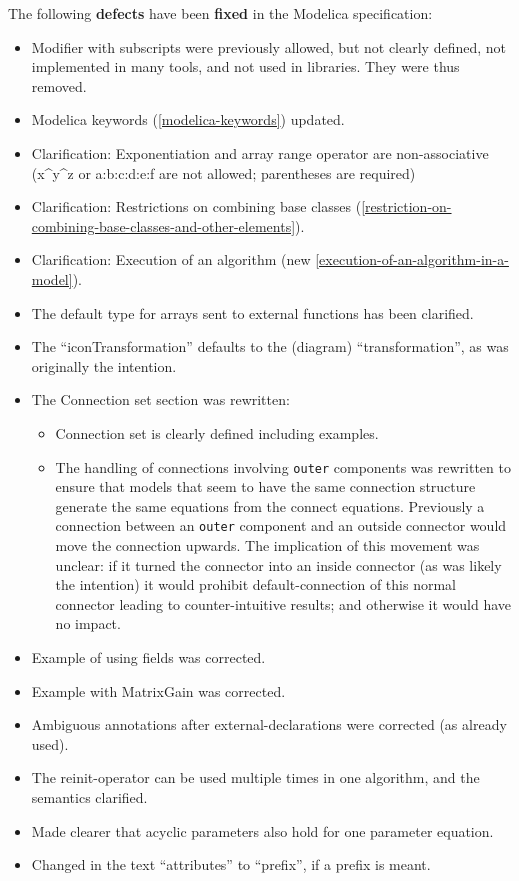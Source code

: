 
The following \textbf{defects} have been \textbf{fixed} in the Modelica
specification:

\begin{itemize}
\item
  Modifier with subscripts were previously allowed, but not clearly
  defined, not implemented in many tools, and not used in libraries.
  They were thus removed.
\item
  Modelica keywords (\autoref{modelica-keywords}) updated.
\item
  Clarification: Exponentiation and array range operator are
  non-associative\\
  (x\^{}y\^{}z or a:b:c:d:e:f are not allowed; parentheses are required)
\item
  Clarification: Restrictions on combining base classes (\autoref{restriction-on-combining-base-classes-and-other-elements}).
\item
  Clarification: Execution of an algorithm (new \autoref{execution-of-an-algorithm-in-a-model}).
\item
  The default type for arrays sent to external functions has been
  clarified.
\item
  The ``iconTransformation'' defaults to the (diagram)
  ``transformation'', as was originally the intention.
\item
  The Connection set section was rewritten:

  \begin{itemize}
  \item
    Connection set is clearly defined including examples.
  \item
    The handling of connections involving \lstinline!outer! components was rewritten
    to ensure that models that seem to have the same connection
    structure generate the same equations from the connect equations.
    Previously a connection between an \lstinline!outer! component and an outside
    connector would move the connection upwards. The implication of this
    movement was unclear: if it turned the connector into an inside
    connector (as was likely the intention) it would prohibit
    default-connection of this normal connector leading to
    counter-intuitive results; and otherwise it would have no impact.
  \end{itemize}
\item
  Example of using fields was corrected.
\item
  Example with MatrixGain was corrected.
\item
  Ambiguous annotations after external-declarations were corrected (as
  already used).
\item
  The reinit-operator can be used multiple times in one algorithm, and
  the semantics clarified.
\item
  Made clearer that acyclic parameters also hold for one parameter
  equation.
\item
  Changed in the text ``attributes'' to ``prefix'', if a prefix is
  meant.
\end{itemize}

